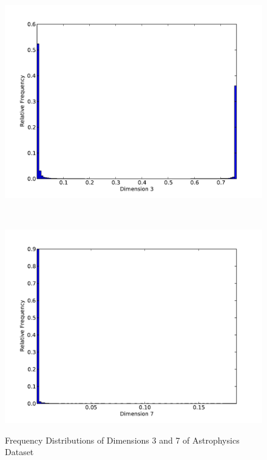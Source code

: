 
\begin{figure}
	\begin{center}
		\begin{subfloat}{%
			\includegraphics[scale=0.36]{figures/histograms/astrophysics_500000_2.pdf}
		}
		\end{subfloat}~
		\begin{subfloat}{%
			\includegraphics[scale=0.36]{figures/histograms/astrophysics_500000_6.pdf}
		}
		\end{subfloat}
	\end{center}

	\caption{Frequency Distributions of Dimensions 3 and 7 of Astrophysics Dataset}
	\label{fig:astrophysics-histograms2}
\end{figure}

